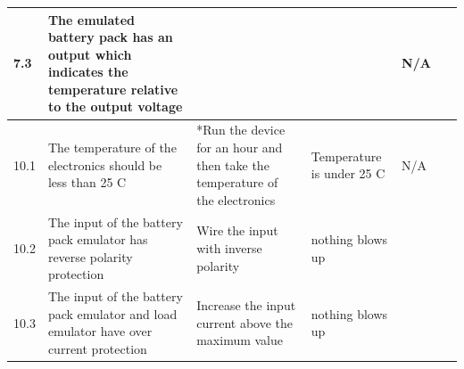 \begin{table}[!ht]
\begin{tabular}{|p{0.3cm}|p{3cm}|p{7cm}|p{3cm}|p{1.5cm}|p{1cm}|}
        7.3 & The emulated battery pack has an output which indicates the temperature relative to the output voltage & ~ & ~ & N/A & ~ \\ \hline
        10.1 & The temperature of the electronics should be less than 25 C & *Run the device for an hour and then take the temperature of the electronics & Temperature is under 25 C & N/A & ~ \\ \hline
        10.2 & The input of the battery pack emulator has reverse polarity protection & Wire the input with inverse polarity  & nothing blows up & ~ & ~ \\ \hline
        10.3 & The input of the battery pack emulator and load emulator have over current protection & Increase the input current above the maximum value  & nothing blows up  & ~ & ~ \\ \hline
    \end{tabular}
    \label{Test Plan}
\end{table}